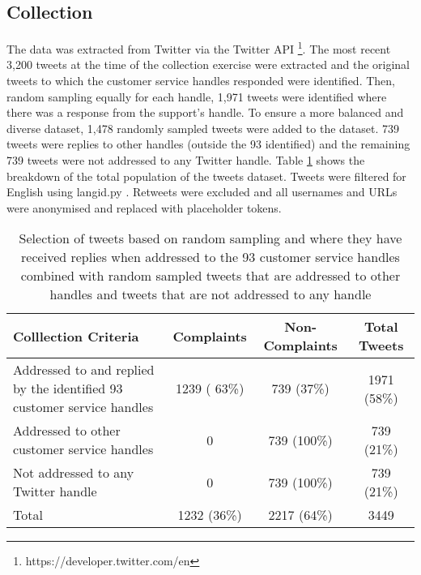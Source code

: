 \subsection{Collection}
The data was extracted from Twitter via the Twitter API \footnote{https://developer.twitter.com/en}. The most recent 3,200 tweets at the time of the collection exercise were extracted and the original tweets to which the customer service handles responded were identified. Then, random sampling equally for each handle, 1,971 tweets were identified where there was a response from the support's handle. To ensure a more balanced and diverse dataset, 1,478 randomly sampled tweets were added to the dataset. 739 tweets were replies to other handles (outside the 93 identified) and the remaining 739 tweets were not addressed to any Twitter handle. Table \ref{tab: tweet_counts} shows the breakdown of the total population of the tweets dataset. Tweets were filtered for English using langid.py \cite{luiLangidPyOfftheshelf2012}. Retweets were excluded and all usernames and URLs were anonymised and replaced with placeholder tokens.
\begin{table}[ht]
    \centering
    \begin{tabularx}{\textwidth}{|X|c|c|c|}
    \hline
    \rowcolor[gray]{0.7}
    \textbf{Colllection Criteria} & \textbf{Complaints} & \textbf{Non-Complaints} & \textbf{Total Tweets} \\
    \hline
    Addressed to and replied by the identified 93 customer service handles & 1239 ( 63\%) & 739 (37\%) & 1971 (58\%) \\
    \hline
    Addressed to other customer service handles & 0 & 739 (100\%)& 739 (21\%) \\
    \hline
    Not addressed to any Twitter handle & 0 & 739 (100\%)& 739 (21\%) \\
    \hline    
    \rowcolor[gray]{0.9}
    Total & 1232 (36\%) & 2217 (64\%) & 3449 \\
    \hline
    \end{tabularx}
    \caption{Selection of tweets based on random sampling and where they have received replies when addressed to the 93 customer service handles combined with random sampled tweets that are addressed to other handles and tweets that are not addressed to any handle}    
    \label{tab: tweet_counts}
\end{table}  


